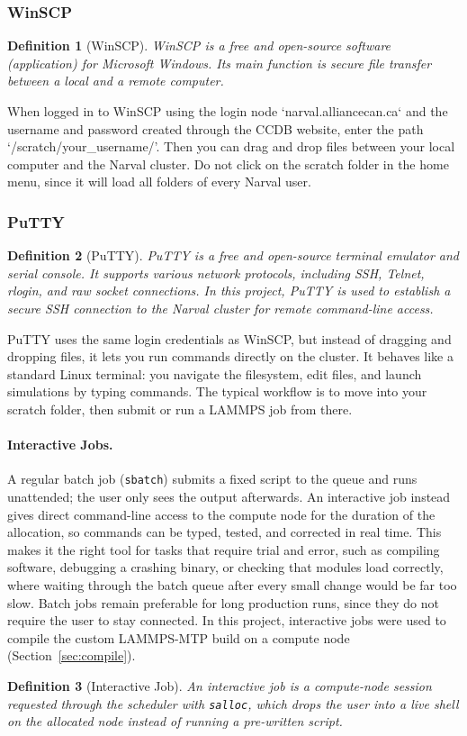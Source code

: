 \documentclass{article}
\newtheorem{definition}{Definition}
\begin{document}
\subsubsection{WinSCP}
\begin{definition}[WinSCP]
    WinSCP is a free and open-source software (application) for Microsoft Windows. Its main function is secure file transfer between a local and a remote computer.
\end{definition}
When logged in to WinSCP using the login node `narval.alliancecan.ca` and the username and password created through the CCDB website, enter the path `/scratch/your\_username/'. Then you can drag and drop files between your local computer and the Narval cluster. Do not click on the scratch folder in the home menu, since it will load all folders of every Narval user.

\subsubsection{PuTTY}
\begin{definition}[PuTTY]
    PuTTY is a free and open-source terminal emulator and serial console. It supports various network protocols, including SSH, Telnet, rlogin, and raw socket connections. In this project, PuTTY is used to establish a secure SSH connection to the Narval cluster for remote command-line access.
\end{definition}
PuTTY uses the same login credentials as WinSCP, but instead of dragging and dropping files, it lets you run commands directly on the cluster. It behaves like a standard Linux terminal: you navigate the filesystem, edit files, and launch simulations by typing commands. The typical workflow is to move into your scratch folder, then submit or run a LAMMPS job from there.

\paragraph{Interactive Jobs.}
A regular batch job (\texttt{sbatch}) submits a fixed script to the queue and runs unattended; the user only sees the output afterwards. An interactive job instead gives direct command-line access to the compute node for the duration of the allocation, so commands can be typed, tested, and corrected in real time. This makes it the right tool for tasks that require trial and error, such as compiling software, debugging a crashing binary, or checking that modules load correctly, where waiting through the batch queue after every small change would be far too slow. Batch jobs remain preferable for long production runs, since they do not require the user to stay connected. In this project, interactive jobs were used to compile the custom LAMMPS-MTP build on a compute node (Section~\ref{sec:compile}).
\begin{definition}[Interactive Job]
    An interactive job is a compute-node session requested through the scheduler with \texttt{salloc}, which drops the user into a live shell on the allocated node instead of running a pre-written script.
\end{definition}
\end{document}
